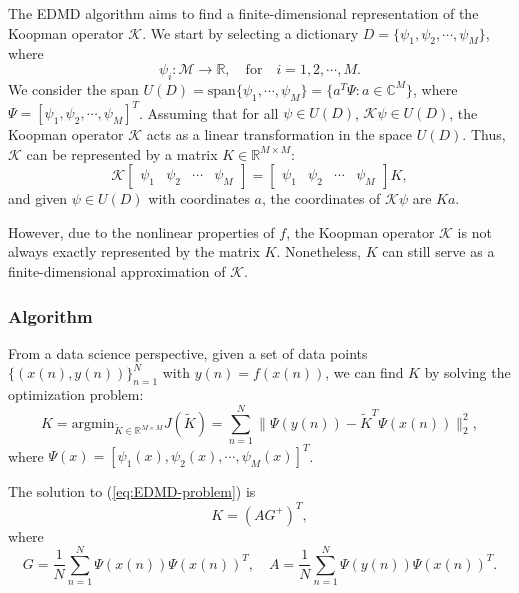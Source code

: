 The EDMD algorithm aims to find a finite-dimensional
representation of the Koopman operator $\mathcal{K}$.
We start by selecting a dictionary $D = \{\psi_1,\psi_2,\cdots,\psi_M\}$,
where
\begin{equation*}
  \psi_i: \mathcal{M} \rightarrow \mathbb{R},
  \quad \text{for} \quad i = 1,2,\cdots, M.
\end{equation*}
We consider the span $U(D) = \text{span}\{\psi_1,\cdots,\psi_M\} = \{a^T\Psi:a \in \mathbb{C}^M\}$,
where $\Psi = [\psi_1,\psi_2,\cdots,\psi_M]^T$.
Assuming that for all $\psi \in U(D)$,
$\mathcal{K} \psi \in U(D)$,
the Koopman operator $\mathcal{K}$
acts as a linear transformation in the space $U(D)$.
Thus, $\mathcal{K}$ can be represented
by a matrix $K \in \mathbb{R}^{M \times M}$:
\begin{equation*}
  \mathcal{K} \left[
    \begin{array}{cccc}
      \psi_1&\psi_2&\cdots&\psi_M
    \end{array}
  \right] = \left[
    \begin{array}{cccc}
      \psi_1&\psi_2&\cdots&\psi_M
    \end{array}
  \right]K,
\end{equation*}
and given $\psi \in U(D)$ with coordinates $a$,
the coordinates of $\mathcal{K} \psi$ are $Ka$.

However, due to the nonlinear properties of $f$,
the Koopman operator $\mathcal{K}$ is not always
exactly represented by the matrix $K$.
Nonetheless, $K$ can still serve as a finite-dimensional
approximation of $\mathcal{K}$.

\subsubsection{Algorithm}

From a data science perspective,
given a set of data points $\{(x(n), y(n))\}_{n = 1}^N$
with $y(n) = f(x(n))$,
we can find $K$ by solving the optimization problem:
\begin{equation}
  \label{eq:EDMD-problem}
  K = \text{argmin}_{\tilde{K} \in \mathbb{R}^{M \times M}} J(\tilde{K})
  = \sum\limits_{n = 1}^N \|\Psi(y(n)) - \tilde{K}^T \Psi(x(n))\|_2^2,
\end{equation}
where $\Psi(x) = [\psi_1(x), \psi_2(x),\cdots,\psi_M(x)]^T$.

\begin{proposition}
  The solution to (\ref{eq:EDMD-problem}) is
  \begin{equation*}
    K = (AG^+)^T,
  \end{equation*}
  where
  \begin{equation*}
    G = \frac{1}{N} \sum\limits_{n = 1}^N \Psi(x(n)) \Psi(x(n))^T,
    \quad A = \frac{1}{N} \sum\limits_{n = 1}^N \Psi(y(n)) \Psi(x(n))^T.
  \end{equation*}
\end{proposition}

